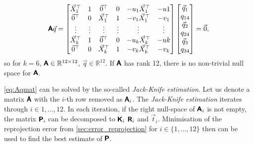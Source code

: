 \begin{equation}
    \label{eq:Aqmat}
    \pmb{\mathsf{A}} \vec{q} = \begin{bmatrix}
        \vec{X}_1^\top & 1 & \vec{0}^\top & 0 & -u_1 \vec{X}_1^\top & -u1 \\
        \vec{0}^\top & 0 & \vec{X}_1^\top & 1 & -v_1 \vec{X}_1^\top & -v_1 \\ 
        \vdots & \vdots & \vdots & \vdots & \vdots & \vdots \\
        \vec{X}_k^\top & 1 & \vec{0}^\top & 0 & -u_k \vec{X}_k^\top & -uk \\
        \vec{0}^\top & 0 & \vec{X}_k^\top & 1 & -v_k \vec{X}_k^\top & -v_k \\ 
    \end{bmatrix} \begin{bmatrix}
        \vec{q}_1 \\ q_{14} \\ \vec{q}_2 \\ q_{24} \\ \vec{q}_3 \\ q_{34}
    \end{bmatrix} = \vec{0},
\end{equation}
so for $k=6$, $\pmb{\mathsf{A}} \in \mathbb{R}^{12 \times 12}$, $\vec{q} \in \mathbb{R}^{12}$. If $\pmb{\mathsf{A}}$ has rank 12, there is no non-trivial null space for $\pmb{\mathsf{A}}$.

\autoref{eq:Aqmat} can be solved by the so-called \textit{Jack-Knife estimation}. 
Let us denote a matrix $\pmb{\mathsf{A}}$ with the $i$-th row removed as $\pmb{\mathsf{A}}_i$. 
The \textit{Jack-Knife estimation} iterates through $i \in {1, \dots, 12}$.
In each iteration, if the right null-space of $\pmb{\mathsf{A}}_i$ is not empty, the matrix $\pmb{\mathsf{P}}_i$ can be decomposed to $\pmb{\mathsf{K}}_i$ $\pmb{\mathsf{R}}_i$ and $\vec{t}_i$.
Minimisation of the reprojection error from \autoref{sec:error_reprojection} for $i \in \{1, \dots, 12\}$ then can be used to find the best estimate of $\pmb{\mathsf{P}}$.

